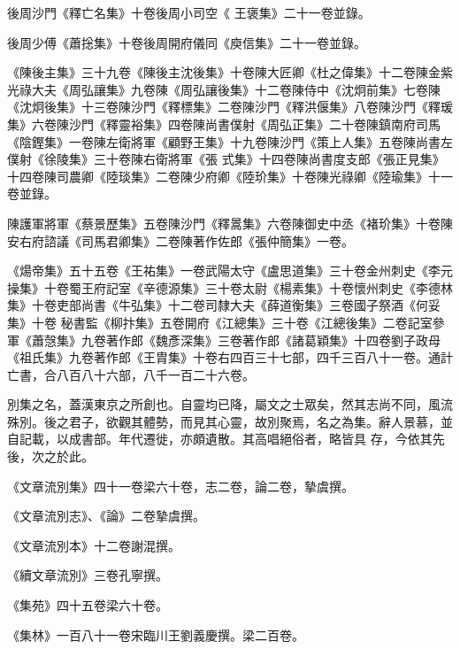 \begin{pinyinscope}
 後周沙門《釋亡名集》十卷後周小司空《
 王褒集》二十一卷並錄。



 後周少傅《蕭捴集》十卷後周開府儀同《庾信集》二十一卷並錄。



 《陳後主集》三十九卷《陳後主沈後集》十卷陳大匠卿《杜之偉集》十二卷陳金紫光祿大夫《周弘讓集》九卷陳《周弘讓後集》十二卷陳侍中《沈炯前集》七卷陳《沈炯後集》十三卷陳沙門《釋標集》二卷陳沙門《釋洪偃集》八卷陳沙門《釋瑗集》六卷陳沙門《釋靈裕集》四卷陳尚書僕射《周弘正集》二十卷陳鎮南府司馬《陰鏗集》一卷陳左衛將軍《顧野王集》十九卷陳沙門《策上人集》五卷陳尚書左僕射《徐陵集》三十卷陳右衛將軍《張
 式集》十四卷陳尚書度支郎《張正見集》十四卷陳司農卿《陸琰集》二卷陳少府卿《陸玠集》十卷陳光祿卿《陸瑜集》十一卷並錄。



 陳護軍將軍《蔡景歷集》五卷陳沙門《釋暠集》六卷陳御史中丞《褚玠集》十卷陳安右府諮議《司馬君卿集》二卷陳著作佐郎《張仲簡集》一卷。



 《煬帝集》五十五卷《王祐集》一卷武陽太守《盧思道集》三十卷金州刺史《李元操集》十卷蜀王府記室《辛德源集》三十卷太尉《楊素集》十卷懷州刺史《李德林集》十卷吏部尚書《牛弘集》十二卷司隸大夫《薛道衡集》三卷國子祭酒《何妥集》十卷
 秘書監《柳抃集》五卷開府《江總集》三十卷《江總後集》二卷記室參軍《蕭愨集》九卷著作郎《魏彥深集》三卷著作郎《諸葛穎集》十四卷劉子政母《祖氏集》九卷著作郎《王胄集》十卷右四百三十七部，四千三百八十一卷。通計亡書，合八百八十六部，八千一百二十六卷。



 別集之名，蓋漢東京之所創也。自靈均已降，屬文之士眾矣，然其志尚不同，風流殊別。後之君子，欲觀其體勢，而見其心靈，故別聚焉，名之為集。辭人景慕，並自記載，以成書部。年代遷徙，亦頗遺散。其高唱絕俗者，略皆具
 存，今依其先後，次之於此。



 《文章流別集》四十一卷梁六十卷，志二卷，論二卷，摯虞撰。



 《文章流別志》、《論》二卷摯虞撰。



 《文章流別本》十二卷謝混撰。



 《續文章流別》三卷孔寧撰。



 《集苑》四十五卷梁六十卷。



 《集林》一百八十一卷宋臨川王劉義慶撰。梁二百卷。




\end{pinyinscope}
